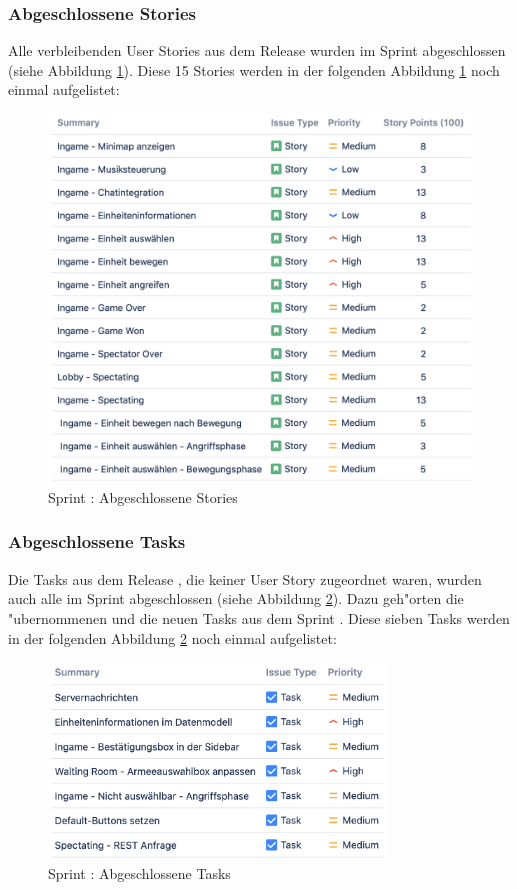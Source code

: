 \documentclass[12pt, titlepage]{scrartcl}
\newcommand{\RN}[1]{%
	\textup{\uppercase\expandafter{\romannumeral#1}}%
}
\begin{document}
	    	\subsubsection{Abgeschlossene Stories}
	    		Alle verbleibenden User Stories aus dem Release \RN{3} wurden im Sprint \RN{6} abgeschlossen (siehe Abbildung \ref{Done_Stories_6}). Diese 15 Stories werden in der folgenden Abbildung \ref{Done_Stories_6} noch einmal aufgelistet:
	    		\begin{figure}[H]
	    			\centering
	    			\includegraphics[width=\textwidth]{images/sprintVI/doneStories.png}
	    			\caption{Sprint \RN{6}: Abgeschlossene Stories}
	    			\label{Done_Stories_6}
	    		\end{figure}
    		\subsubsection{Abgeschlossene Tasks}
    			Die Tasks aus dem Release \RN{3}, die keiner User Story zugeordnet waren, wurden auch alle im Sprint \RN{6} abgeschlossen (siehe Abbildung \ref{Done_Tasks_6}). Dazu geh"orten die "ubernommenen und die neuen Tasks aus dem Sprint \RN{6}. Diese sieben Tasks werden in der folgenden Abbildung \ref{Done_Tasks_6} noch einmal aufgelistet:
    			\begin{figure}[H]
    				\centering
    				\includegraphics[width=0.8\textwidth]{images/sprintVI/doneTasks.png}
    				\caption{Sprint \RN{6}: Abgeschlossene Tasks}
    				\label{Done_Tasks_6}
    			\end{figure}
\end{document}
